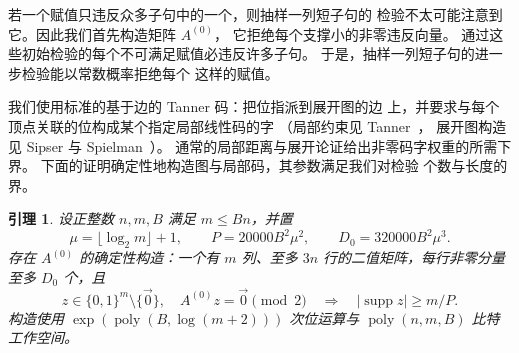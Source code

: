 \documentclass[11pt,reqno]{amsart}
\numberwithin{equation}{section}
\newtheorem{lemma}[theorem]{引理}
\theoremstyle{definition}\newtheorem{definition}[theorem]{定义}
\theoremstyle{remark}\newtheorem{remark}[theorem]{注}
\newcommand{\poly}{\operatorname{poly}}
\renewcommand{\le}{\leqslant}
\renewcommand{\ge}{\geqslant}
\begin{document}
若一个赋值只违反众多子句中的一个，则抽样一列短子句的
检验不太可能注意到它。因此我们首先构造矩阵 $A^{(0)}$，
它拒绝每个支撑小的非零违反向量。
通过这些初始检验的每个不可满足赋值必违反许多子句。
于是，抽样一列短子句的进一步检验能以常数概率拒绝每个
这样的赋值。

我们使用标准的基于边的 Tanner 码：把位指派到展开图的边
上，并要求与每个顶点关联的位构成某个指定局部线性码的字
（局部约束见 Tanner~\cite[Section~II]{Tanner81}，
展开图构造见 Sipser 与 Spielman~\cite[Sections~IV and~VI]{SS96}）。
通常的局部距离与展开论证给出非零码字权重的所需下界。
下面的证明确定性地构造图与局部码，其参数满足我们对检验
个数与长度的界。

\begin{lemma}\label{lem:sparse-checks}
设正整数 $n,m,B$ 满足 $m\le Bn$，并置
\[
 \mu=\lfloor\log_2 m\rfloor+1,\qquad
 P=20000B^2\mu^2,\qquad D_0=320000B^2\mu^3.
\]
存在 $A^{(0)}$ 的确定性构造：一个有 $m$ 列、至多 $3n$
行的二值矩阵，每行非零分量至多 $D_0$ 个，且
\[
 z\in\{0,1\}^m\setminus\{\vec{0}\},\quad
 A^{(0)}z=\vec{0}\pmod2
 \quad\Longrightarrow\quad
 |\operatorname{supp}z|\ge m/P.
\]
构造使用 $\exp(\poly(B,\log(m+2)))$ 次位运算与
$\poly(n,m,B)$ 比特工作空间。
\end{lemma}
\end{document}

